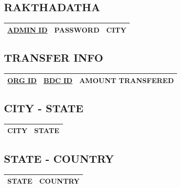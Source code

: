 \begin{sloppypar}
\subsection{RAKTHADATHA}

\begin{tabular}{ | c | c | c | }
 \hline
 \underline{ADMIN ID} & PASSWORD & CITY \\
 \hline
\end{tabular}

\subsection{TRANSFER INFO}

\begin{tabular}{ | c | c | c |}
 \hline
 \underline{ORG ID} & \underline{BDC ID} & AMOUNT TRANSFERED \\
 \hline
\end{tabular}

\subsection{CITY - STATE}

\begin{tabular}{ | c | c | }
 \hline
 CITY & STATE \\
 \hline
\end{tabular}

\subsection{STATE - COUNTRY}

\begin{tabular}{ | c | c | }
 \hline
 STATE & COUNTRY \\
 \hline
\end{tabular}
\end{sloppypar}

